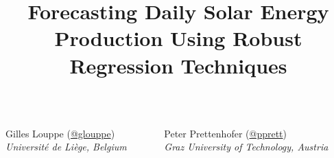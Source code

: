 \documentclass[handout]{beamer}
\title{Forecasting Daily Solar Energy Production Using Robust Regression Techniques}
\date{}
\begin{document}

\begin{frame}
\titlepage

\vspace{-2cm}

\begin{columns}[T]
\begin{column}{.48\textwidth}

\centering
Gilles Louppe (\href{https://twitter.com/glouppe}{@glouppe})\\
{\small\it Université de Liège, Belgium}

\end{column}
\begin{column}{.48\textwidth}

\centering
Peter Prettenhofer (\href{https://twitter.com/pprett}{@pprett})\\
{\small\it Graz University of Technology, Austria}

\end{column}
\end{columns}


\end{frame}


\end{document}

